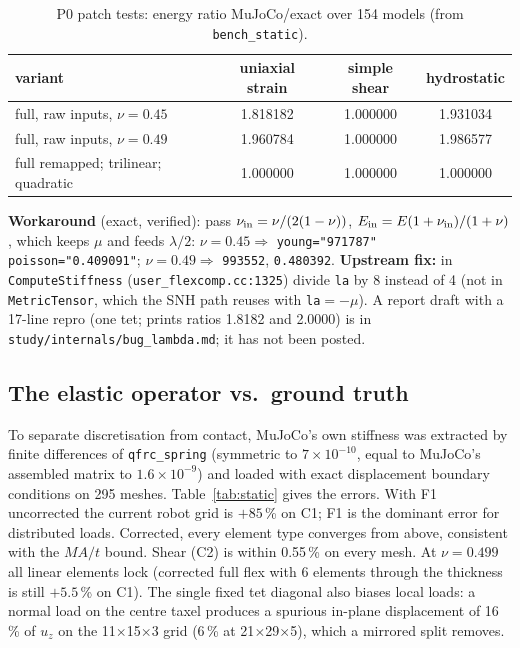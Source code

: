 \documentclass[10pt,twocolumn]{article}
\newcommand{\code}[1]{\texttt{\small #1}}
\newcommand{\src}[1]{\texttt{\footnotesize #1}}
\begin{document}
\begin{table}[t]\centering\footnotesize
\caption{P0 patch tests: energy ratio MuJoCo/exact over 154 models (from \code{bench\_static}).}
\setlength{\tabcolsep}{3.5pt}
\label{tab:patch}
\begin{tabular}{@{}lccc@{}}\toprule
variant & uniaxial strain & simple shear & hydrostatic\\\midrule
full, raw inputs, $\nu=0.45$ & 1.818182 & 1.000000 & 1.931034\\
full, raw inputs, $\nu=0.49$ & 1.960784 & 1.000000 & 1.986577\\
full remapped; trilinear; quadratic & 1.000000 & 1.000000 & 1.000000\\\bottomrule
\end{tabular}
\end{table}

\textbf{Workaround} (exact, verified): pass
$\nu_{\rm in}=\nu/(2(1-\nu))$, $E_{\rm in}=E(1+\nu_{\rm in})/(1+\nu)$, which keeps $\mu$ and feeds $\lambda/2$:
$\nu=0.45\Rightarrow$ \code{young="971787" poisson="0.409091"}; $\nu=0.49\Rightarrow$ \code{993552}, \code{0.480392}.
\textbf{Upstream fix:} in \code{ComputeStiffness} (\src{user\_flexcomp.cc:1325}) divide \code{la} by 8 instead of 4
(not in \code{MetricTensor}, which the SNH path reuses with \code{la}$=-\mu$). A report draft with a 17-line repro
(one tet; prints ratios 1.8182 and 2.0000) is in \code{study/internals/bug\_lambda.md}; it has not been posted.

\subsection{The elastic operator vs.\ ground truth}
To separate discretisation from contact, MuJoCo's own stiffness was extracted by finite differences of
\code{qfrc\_spring} (symmetric to $7\times10^{-10}$, equal to MuJoCo's assembled matrix to $1.6\times10^{-9}$) and
loaded with exact displacement boundary conditions on 295 meshes. Table~\ref{tab:static} gives the errors. With F1
uncorrected the current robot grid is $+85$\,\% on C1; F1 is the dominant error for distributed loads. Corrected,
every element type converges from above, consistent with the $MA/t$ bound. Shear (C2) is within 0.55\,\% on every
mesh. At $\nu=0.499$ all linear elements lock (corrected full flex with 6 elements through the thickness is still
$+5.5$\,\% on C1). The single fixed tet diagonal also biases local loads: a normal load on the centre taxel produces a
spurious in-plane displacement of 16\,\% of $u_z$ on the 11$\times$15$\times$3 grid (6\,\% at 21$\times$29$\times$5),
which a mirrored split removes.
\end{document}
